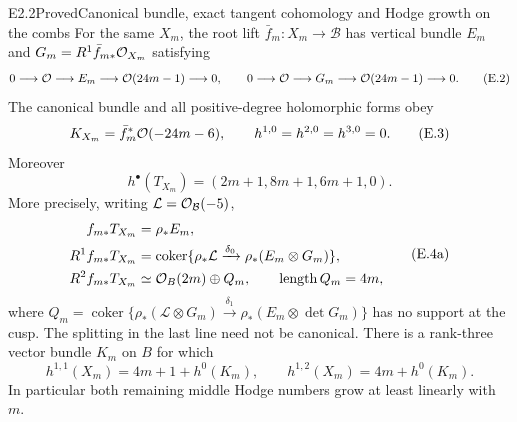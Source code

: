 \begin{claim}{E2.2}{Proved}{Canonical bundle, exact tangent cohomology and Hodge growth on the combs}
For the same $X_m$, the root lift $\bar f_m:X_m\to\mathcal B$ has
vertical bundle $E_m$ and $G_m=R^1\bar f_{m*}\mathcal O_{X_m}$ satisfying
\[
 0\longrightarrow\mathcal O\longrightarrow E_m
       \longrightarrow\mathcal O(24m-1)\longrightarrow0,
 \qquad
 0\longrightarrow\mathcal O\longrightarrow G_m
       \longrightarrow\mathcal O(24m-1)\longrightarrow0.      \tag{E.2}
\]
The canonical bundle and all positive-degree holomorphic forms obey
\[
 K_{X_m}=\bar f_m^*\mathcal O(-24m-6),\qquad
 h^{1,0}=h^{2,0}=h^{3,0}=0.                            \tag{E.3}
\]
Moreover
\[
 \boxed{h^\bullet(T_{X_m})=(2m+1,8m+1,6m+1,0).}       \tag{E.4}
\]
More precisely, writing $\mathcal L=\mathcal O_{\mathcal B}(-5)$,
\[
 \begin{split}
 f_{m*}T_{X_m}&=\rho_*E_m,\\
 R^1f_{m*}T_{X_m}&=
  \operatorname{coker}\{\rho_*\mathcal L\xrightarrow{\delta_0}
                                      \rho_*(E_m\otimes G_m)\},\\
 R^2f_{m*}T_{X_m}&\simeq\mathcal O_B(2m)\oplus Q_m,
 \qquad\operatorname{length}Q_m=4m,
 \end{split}                                        \tag{E.4a}
\]
where $Q_m=\operatorname{coker}\{\rho_*(\mathcal L\otimes G_m)
\xrightarrow{\delta_1}\rho_*(E_m\otimes\det G_m)\}$ has no support
at the cusp. The splitting in the last line need not be canonical.
There is a rank-three vector bundle $K_m$ on $B$ for which
\[
 \boxed{h^{1,1}(X_m)=4m+1+h^0(K_m),\qquad
 h^{1,2}(X_m)=4m+h^0(K_m).}                            \tag{E.5}
\]
In particular both remaining middle Hodge numbers grow at least
linearly with $m$.
\end{claim}
